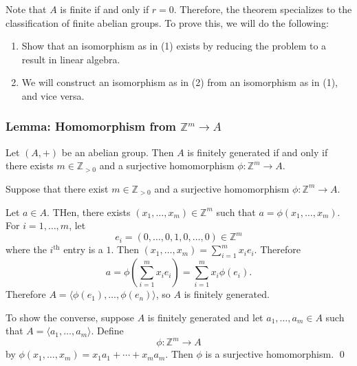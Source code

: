 \documentclass{article}
\renewenvironment{proof}{{\bfseries\color{blue1} Proof:}}{\qed}
\begin{document}
Note that $A$ is finite if and only if $r=0$. Therefore, the theorem specializes to the classification of finite abelian groups. To prove this, we will do the following:
\begin{enumerate}
    \item Show that an isomorphism as in (1) exists by reducing the problem to a result in linear algebra.
    \item We will construct an isomorphism as in (2) from an isomorphism as in (1), and vice versa.
\end{enumerate}
\subsubsection{Lemma: Homomorphism from $\mathbb{Z}^m \rightarrow A$}
\begin{idea}
    Let $(A,+)$ be an abelian group. Then $A$ is finitely generated if and only if there exists $m\in \mathbb{Z}_{>0}$ and a surjective homomorphism $\phi:\mathbb{Z}^m \rightarrow A$.
\end{idea}
\begin{proof}
    Suppose that there exist $m\in \mathbb{Z}_{>0}$ and a surjective homomorphism $\phi: \mathbb{Z}^m \rightarrow A$.

    Let $a \in A$. THen, there exists $(x_1,\dots,x_m)\in \mathbb{Z}^m$ such that $a = \phi(x_1,\dots,x_m)$. For $i=1,\dots,m$, let
    \begin{equation}
        e_i = (0,\dots,0,1,0,\dots,0)\in \mathbb{Z}^m
    \end{equation}
    where the $i^\text{th}$ entry is a $1$. Then $(x_1,\dots,x_m) = \sum_{i=1}^m x_ie_i$. Therefore
    \begin{equation}
        a = \phi\left(\sum_{i=1}^mx_ie_i\right) = \sum_{i=1}^m x_i \phi(e_i).
    \end{equation}
    Therefore $A = \langle \phi(e_1),\dots,\phi(e_n)\rangle$, so $A$ is finitely generated.

    To show the converse, suppose $A$ is finitely generated and let $a_1,\dots,a_m\in A$ such that $A = \langle a_1,\dots, a_m\rangle$. Define 
    \begin{equation}
        \phi: \mathbb{Z}^m \rightarrow A
    \end{equation}
    by $\phi(x_1,\dots,x_m)=x_1a_1+\cdots + x_ma_m$. Then $\phi$ is a surjective homomorphism.
\end{proof}
\end{document}
